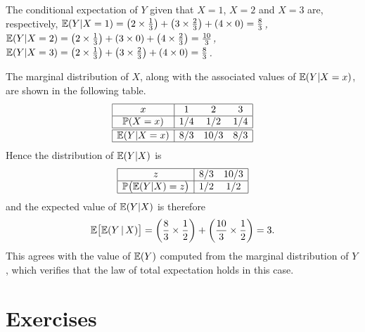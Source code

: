 \begin{solution}
The conditional expectation of $Y$ given that $X=1$, $X=2$ and $X=3$ are, respectively,
\bit
\it $\mathbb{E}(Y|X=1) = \left(2\times\frac{1}{3}\right) + \left(3\times\frac{2}{3}\right) + \left(4\times 0\right) = \frac{8}{3}$,
\it $\mathbb{E}(Y|X=2) = \left(2\times\frac{1}{3}\right) + \left(3\times 0\right) + \left(4\times\frac{2}{3}\right) = \frac{10}{3}$,
\it $\mathbb{E}(Y|X=3) = \left(2\times\frac{1}{3}\right) + \left(3\times\frac{2}{3}\right) + \left(4\times 0\right) = \frac{8}{3}$.
\eit

The marginal distribution of $X$, along with the associated values of $\mathbb{E}(Y|X=x)$, are shown in the following table.
\[\begin{array}{|c|ccc|}\hline
x				& 1		& 2		& 3		\\ \hline
\mathbb{P}(X=x)		& 1/4	& 1/2	& 1/4	\\ \hline \hline
\mathbb{E}(Y|X=x)		& 8/3	& 10/3	& 8/3	\\ \hline
\end{array}\]
Hence the distribution of $\mathbb{E}(Y|X)$ is
\[\begin{array}{|c|cc|}\hline
z							& 8/3   & 10/3 \\ \hline
\mathbb{P}\big(\mathbb{E}(Y|X)=z\big)	& 1/2   & 1/2  \\ \hline
\end{array}\]
and the expected value of $\mathbb{E}(Y|X)$ is therefore 
\[
\mathbb{E}\big[\mathbb{E}(Y\,|\,X)\big] = \left(\frac{8}{3}\times\frac{1}{2}\right) + \left(\frac{10}{3}\times\frac{1}{2}\right) = 3.
\]
This agrees with the value of $\mathbb{E}(Y)$ computed from the marginal distribution of $Y$, which verifies that the law of total expectation holds in this case. 
\end{solution}


\section{Exercises}


\endinput
